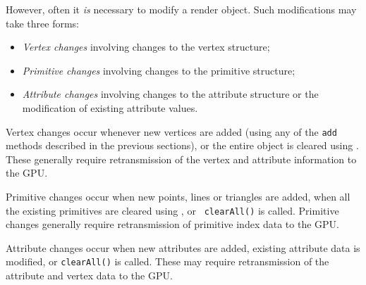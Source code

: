 However, often it {\it is} necessary to modify a render object.  Such
modifications may take three forms:

\begin{itemize}

\item {\it Vertex changes} involving changes to the vertex structure;

\item {\it Primitive changes} involving changes to the primitive structure;

\item {\it Attribute changes} involving changes to the attribute
structure or the modification of existing attribute values.

\end{itemize}

Vertex changes occur whenever new vertices are added (using any of the
{\tt add} methods described in the previous sections), or the entire
object is cleared using
.  These generally
require retransmission of the vertex and attribute information to the
GPU.

Primitive changes occur when new points, lines or triangles are added,
when all the existing primitives are cleared using
, or {\tt
clearAll()} is called.  Primitive changes generally require
retransmission of primitive index data to the GPU.

Attribute changes occur when new attributes are added, existing
attribute data is modified, or {\tt clearAll()} is called.  These may
require retransmission of the attribute and vertex data to the GPU.

